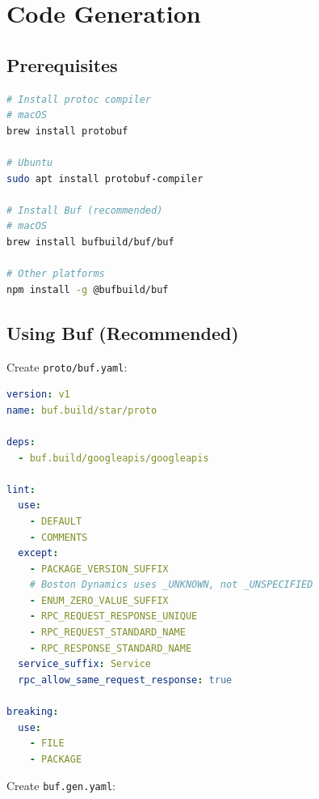 \section{Code Generation}

\subsection{Prerequisites}

\begin{lstlisting}[language=bash]
# Install protoc compiler
# macOS
brew install protobuf

# Ubuntu
sudo apt install protobuf-compiler

# Install Buf (recommended)
# macOS
brew install bufbuild/buf/buf

# Other platforms
npm install -g @bufbuild/buf
\end{lstlisting}

\subsection{Using Buf (Recommended)}

Create \texttt{proto/buf.yaml}:

\begin{lstlisting}[language=yaml, caption=proto/buf.yaml]
version: v1
name: buf.build/star/proto

deps:
  - buf.build/googleapis/googleapis

lint:
  use:
    - DEFAULT
    - COMMENTS
  except:
    - PACKAGE_VERSION_SUFFIX
    # Boston Dynamics uses _UNKNOWN, not _UNSPECIFIED
    - ENUM_ZERO_VALUE_SUFFIX
    - RPC_REQUEST_RESPONSE_UNIQUE
    - RPC_REQUEST_STANDARD_NAME
    - RPC_RESPONSE_STANDARD_NAME
  service_suffix: Service
  rpc_allow_same_request_response: true

breaking:
  use:
    - FILE
    - PACKAGE
\end{lstlisting}

Create \texttt{buf.gen.yaml}:

